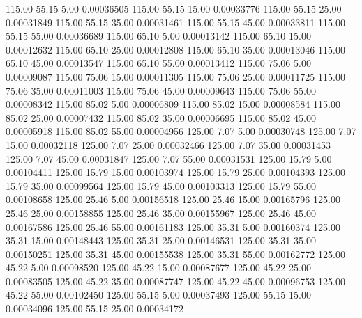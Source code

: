     115.00     55.15      5.00     0.00036505
    115.00     55.15     15.00     0.00033776
    115.00     55.15     25.00     0.00031849
    115.00     55.15     35.00     0.00031461
    115.00     55.15     45.00     0.00033811
    115.00     55.15     55.00     0.00036689
    115.00     65.10      5.00     0.00013142
    115.00     65.10     15.00     0.00012632
    115.00     65.10     25.00     0.00012808
    115.00     65.10     35.00     0.00013046
    115.00     65.10     45.00     0.00013547
    115.00     65.10     55.00     0.00013412
    115.00     75.06      5.00     0.00009087
    115.00     75.06     15.00     0.00011305
    115.00     75.06     25.00     0.00011725
    115.00     75.06     35.00     0.00011003
    115.00     75.06     45.00     0.00009643
    115.00     75.06     55.00     0.00008342
    115.00     85.02      5.00     0.00006809
    115.00     85.02     15.00     0.00008584
    115.00     85.02     25.00     0.00007432
    115.00     85.02     35.00     0.00006695
    115.00     85.02     45.00     0.00005918
    115.00     85.02     55.00     0.00004956
    125.00      7.07      5.00     0.00030748
    125.00      7.07     15.00     0.00032118
    125.00      7.07     25.00     0.00032466
    125.00      7.07     35.00     0.00031453
    125.00      7.07     45.00     0.00031847
    125.00      7.07     55.00     0.00031531
    125.00     15.79      5.00     0.00104411
    125.00     15.79     15.00     0.00103974
    125.00     15.79     25.00     0.00104393
    125.00     15.79     35.00     0.00099564
    125.00     15.79     45.00     0.00103313
    125.00     15.79     55.00     0.00108658
    125.00     25.46      5.00     0.00156518
    125.00     25.46     15.00     0.00165796
    125.00     25.46     25.00     0.00158855
    125.00     25.46     35.00     0.00155967
    125.00     25.46     45.00     0.00167586
    125.00     25.46     55.00     0.00161183
    125.00     35.31      5.00     0.00160374
    125.00     35.31     15.00     0.00148443
    125.00     35.31     25.00     0.00146531
    125.00     35.31     35.00     0.00150251
    125.00     35.31     45.00     0.00155538
    125.00     35.31     55.00     0.00162772
    125.00     45.22      5.00     0.00098520
    125.00     45.22     15.00     0.00087677
    125.00     45.22     25.00     0.00083505
    125.00     45.22     35.00     0.00087747
    125.00     45.22     45.00     0.00096753
    125.00     45.22     55.00     0.00102450
    125.00     55.15      5.00     0.00037493
    125.00     55.15     15.00     0.00034096
    125.00     55.15     25.00     0.00034172
